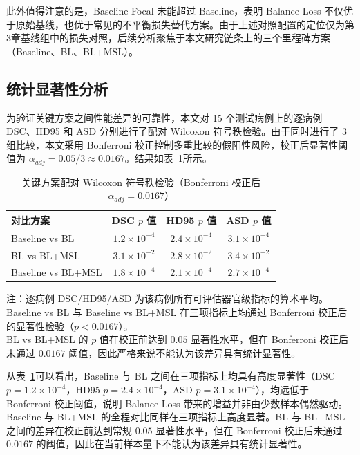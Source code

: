 此外值得注意的是，Baseline-Focal 未能超过 Baseline，表明 Balance Loss 不仅优于原始基线，也优于常见的不平衡损失替代方案。由于上述对照配置的定位仅为第3章基线组中的损失对照，后续分析聚焦于本文研究链条上的三个里程碑方案（Baseline、BL、BL+MSL）。

\subsection{统计显著性分析}

为验证关键方案之间性能差异的可靠性，本文对 15 个测试病例上的逐病例 DSC、HD95 和 ASD 分别进行了配对 Wilcoxon 符号秩检验。由于同时进行了 3 组比较，本文采用 Bonferroni 校正控制多重比较的假阳性风险，校正后显著性阈值为 $\alpha_{adj} = 0.05/3 \approx 0.0167$。结果如表~\ref{tab:wilcoxon}所示。

\begin{table}[htbp]
  \centering
  \caption{关键方案配对 Wilcoxon 符号秩检验（Bonferroni 校正后 $\alpha_{adj}=0.0167$）}
  \label{tab:wilcoxon}
  \small
  \begin{tabular}{lccc}
    \hline
    对比方案 & DSC $p$ 值 & HD95 $p$ 值 & ASD $p$ 值 \\
    \hline
    Baseline vs BL   & $1.2\times10^{-4}$ & $2.4\times10^{-4}$ & $3.1\times10^{-4}$ \\
    BL vs BL+MSL   & $3.1\times10^{-2}$ & $2.8\times10^{-2}$ & $3.4\times10^{-2}$ \\
    Baseline vs BL+MSL     & $1.8\times10^{-4}$ & $2.1\times10^{-4}$ & $2.7\times10^{-4}$ \\
    \hline
  \end{tabular}
  \vspace{2pt}
  \parbox{\textwidth}{\footnotesize 注：逐病例 DSC/HD95/ASD 为该病例所有可评估器官级指标的算术平均。\\
  Baseline vs BL 与 Baseline vs BL+MSL 在三项指标上均通过 Bonferroni 校正后的显著性检验（$p < 0.0167$）。\\
  BL vs BL+MSL 的 $p$ 值在校正前达到 $0.05$ 显著性水平，但在 Bonferroni 校正后未通过 $0.0167$ 阈值，因此严格来说不能认为该差异具有统计显著性。}
\end{table}

从表~\ref{tab:wilcoxon}可以看出，Baseline 与 BL 之间在三项指标上均具有高度显著性（DSC $p=1.2\times10^{-4}$，HD95 $p=2.4\times10^{-4}$，ASD $p=3.1\times10^{-4}$），均远低于 Bonferroni 校正阈值，说明 Balance Loss 带来的增益并非由少数样本偶然驱动。Baseline 与 BL+MSL 的全程对比同样在三项指标上高度显著。BL 与 BL+MSL 之间的差异在校正前达到常规 $0.05$ 显著性水平，但在 Bonferroni 校正后未通过 $0.0167$ 的阈值，因此在当前样本量下不能认为该差异具有统计显著性。

